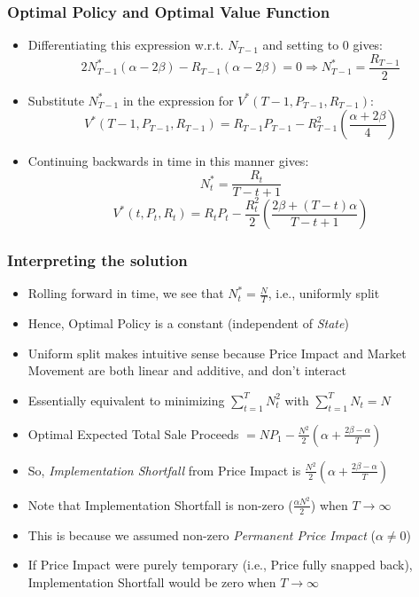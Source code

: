 \documentclass[handout]{beamer}
\begin{document}
\begin{frame}
\frametitle{Optimal Policy and Optimal Value Function}
\pause
\begin{itemize}[<+->]
\item Differentiating this expression w.r.t. $N_{T-1}$ and setting to 0 gives:
$$2N^*_{T-1} (\alpha - 2\beta) - R_{T-1}(\alpha - 2\beta) = 0 \Rightarrow N^*_{T-1} = \frac {R_{T-1}} 2$$
\item Substitute $N^*_{T-1}$ in the expression for $V^*(T-1,P_{T-1},R_{T-1})$:
$$V^*(T-1,P_{T-1},R_{T-1}) =  R_{T-1} P_{T-1} - R_{T-1}^2 (\frac {\alpha + 2\beta} 4)$$
\item Continuing backwards in time in this manner gives:
$$N^*_t = \frac {R_t} {T-t+1}$$
$$V^*(t, P_t,R_t) = R_t P_t - \frac {R_t^2} 2 (\frac {2\beta + (T-t)\alpha} {T-t+1})$$
\end{itemize}
\end{frame}

\begin{frame}
\frametitle{Interpreting the solution}
\pause
\begin{itemize}[<+->]
\item Rolling forward in time, we see that $N^*_t = \frac N T$, i.e., uniformly split
\item Hence, Optimal Policy is a constant (independent of {\em State})
\item Uniform split makes intuitive sense because Price Impact and Market Movement are both linear and additive, and don't interact
\item Essentially equivalent to minimizing $\sum_{t=1}^T N_t^2$ with $\sum_{t=1}^T N_t = N$
\item Optimal Expected Total Sale Proceeds $= NP_1 - \frac {N^2} 2 (\alpha + \frac {2\beta - \alpha} T)$
\item So, {\em Implementation Shortfall} from Price Impact is $\frac {N^2} 2 (\alpha + \frac {2\beta - \alpha} T)$
\item Note that Implementation Shortfall is non-zero ($\frac {\alpha N^2} 2$) when $T\rightarrow \infty$
\item This is because we assumed non-zero {\em Permanent Price Impact} ($\alpha \neq 0$)
\item If Price Impact were purely temporary (i.e., Price fully snapped back), Implementation Shortfall would be zero when $T\rightarrow \infty$
\end{itemize}
\end{frame}
\end{document}
